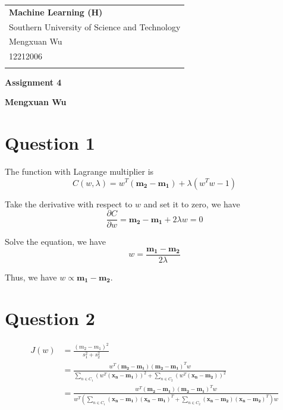 \documentclass[a4paper,12pt]{article}
\newcommand{\pard}[2]{\frac{\partial #1}{\partial #2}}
\begin{document}
\thispagestyle{empty} %

\begin{tabular}{p{15.5cm}}
{\large \bf Machine Learning (H)} \\
Southern University of Science and Technology \\ Mengxuan Wu \\ 12212006 \\
\hline
\\
\end{tabular}

\vspace*{0.3cm} %

\begin{center}
	{\Large \bf Assignment 4}
	\vspace{2mm}

	{\bf Mengxuan Wu}
		
\end{center}  

\vspace{0.4cm}

\section*{Question 1}

The function with Lagrange multiplier is
\begin{equation*}
	C(w, \lambda) = w^T (\mathbf{m_2} - \mathbf{m_1}) + \lambda (w^T w - 1)
\end{equation*}

Take the derivative with respect to $w$ and set it to zero, we have
\begin{equation*}
	\pard{C}{w} = \mathbf{m_2} - \mathbf{m_1} + 2 \lambda w = 0
\end{equation*}

Solve the equation, we have
\begin{equation*}
	w = \frac{\mathbf{m_1} - \mathbf{m_2}}{2 \lambda}
\end{equation*}

Thus, we have $w \propto \mathbf{m_1} - \mathbf{m_2}$.

\section*{Question 2}

\begin{align*}
	J(w) &= \frac{(m_2 - m_1)^2}{s_1^2 + s_2^2} \\
	&= \frac{w^T (\mathbf{m_2} - \mathbf{m_1}) (\mathbf{m_2} - \mathbf{m_1})^T w}{\sum_{n \in C_1} (w^T (\mathbf{x_n} - \mathbf{m_1}))^2 + \sum_{n \in C_2} (w^T (\mathbf{x_n} - \mathbf{m_2}))^2} \\
	&= \frac{w^T (\mathbf{m_2} - \mathbf{m_1}) (\mathbf{m_2} - \mathbf{m_1})^T w}{w^T \left(\sum_{n \in C_1} (\mathbf{x_n} - \mathbf{m_1}) (\mathbf{x_n} - \mathbf{m_1})^T + \sum_{n \in C_2} (\mathbf{x_n} - \mathbf{m_2}) (\mathbf{x_n} - \mathbf{m_2})^T \right) w} \\
\end{align*}
\end{document}
